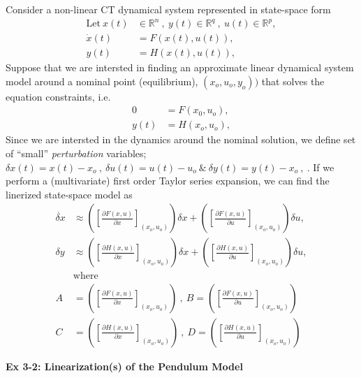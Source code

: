 \documentclass[twoside]{article}
\begin{document}
Consider a non-linear CT dynamical system represented in state-space form
%
\begin{align*}
  \mathrm{Let} \ x(t) &\in \mathbb{R}^n \ , \ y(t) \in \mathbb{R}^q \ ,\  u(t) \in
  \mathbb{R}^p , \\
  \dot{x}(t) &= F(x(t),u(t)) , \\
  y(t) &= H(x(t),u(t)) , 
\end{align*}
%
Suppose that we are intersted in finding an approximate linear
dynamical system model around a nominal point (equilibrium),
$(x_o,u_o,y_o))$ that solves the equation constraints, i.e.
%
\begin{align*}
  0 &= F(x_0,u_o) , \\
  y(t) &= H(x_o,u_o) , 
\end{align*}
%
Since we are intersted in the dynamics around the nominal solution, we
define set of ``small'' \textit{perturbation} variables; $\delta x(t)
= x(t) - x_o \ , \ \delta u(t) = u(t) - u_o \ \& \ \delta y(t) = y(t)
- x_o \ , \ $. If we perform a (multivariate) first order Taylor
series expansion, we can find the linerized state-space model as
%
\begin{align*}
  \dot{\delta x} &\approx \left( \left[ \frac{\partial F(x,u)}{\partial x}
                      \right]_{(x_o,u_o)} \right) \delta x + \left( \left[ \frac{\partial F(x,u)}{\partial u}
                      \right]_{(x_o,u_o)} \right) \delta u  , \\
  \delta y  &\approx \left( \left[ \frac{\partial H(x,u)}{\partial x}
                      \right]_{(x_o,u_o)} \right) \delta x + \left( \left[ \frac{\partial H(x,u)}{\partial u}
                      \right]_{(x_o,u_o)} \right) \delta u , 
\\ 
&\mathrm{where}
\\
A &= \left( \left[ \frac{\partial F(x,u)}{\partial x}
                      \right]_{(x_o,u_o)} \right) \ , \ B = \left( \left[ \frac{\partial F(x,u)}{\partial u}
                      \right]_{(x_o,u_o)} \right)
\\
C &= \left( \left[ \frac{\partial H(x,u)}{\partial x}
                      \right]_{(x_o,u_o)} \right) \ , \ D = \left( \left[ \frac{\partial H(x,u)}{\partial u}
                      \right]_{(x_o,u_o)} \right)
\end{align*}
%

\textbf{Ex 3-2: Linearization(s) of the Pendulum Model}
\end{document}
